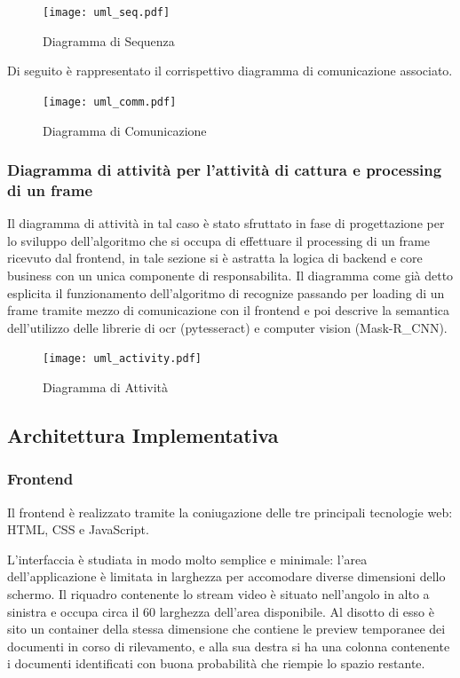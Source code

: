 \documentclass[12pt,a4paper]{article}
\newcommand{\mrcnn}{Mask-R\_CNN}
\begin{document}
\begin{figure}[H]
    \caption{Diagramma di Sequenza}
    \centering
    \texttt{[image: uml\_seq.pdf]}
\end{figure}

Di seguito è rappresentato il corrispettivo diagramma di comunicazione
associato.

\begin{figure}[H]
    \caption{Diagramma di Comunicazione}
    \centering
    \texttt{[image: uml\_comm.pdf]}
\end{figure}

\subsubsection{Diagramma di attività per l'attività di cattura e processing di un
frame}

Il diagramma di attività in tal caso è stato sfruttato in fase di progettazione
per lo sviluppo dell'algoritmo che si occupa di effettuare il processing di un
frame ricevuto dal frontend, in tale sezione si è astratta la logica di backend
e core business con un unica componente di responsabilita. Il diagramma come
già detto esplicita il funzionamento dell'algoritmo di recognize passando per
loading di un frame tramite mezzo di comunicazione  con il frontend e poi
descrive la semantica dell'utilizzo delle librerie di ocr (pytesseract) e
computer vision (\mrcnn).

\begin{figure}[p]
    \caption{Diagramma di Attività}
    \centering
    \texttt{[image: uml\_activity.pdf]}
\end{figure}

\pagebreak

\subsection{Architettura Implementativa}

\subsubsection{Frontend}

Il frontend è realizzato tramite la coniugazione delle tre principali
tecnologie web: HTML, CSS e JavaScript.

L'interfaccia è studiata in modo molto semplice e minimale: l'area
dell'applicazione è limitata in larghezza per accomodare diverse
dimensioni dello schermo. Il riquadro contenente lo stream video è
situato nell'angolo in alto a sinistra e occupa circa il 60%
larghezza dell'area disponibile. Al disotto di esso è sito un container
della stessa dimensione che contiene le preview temporanee dei documenti
in corso di rilevamento, e alla sua destra si ha una colonna contenente
i documenti identificati con buona probabilità che riempie lo spazio
restante.
\end{document}
